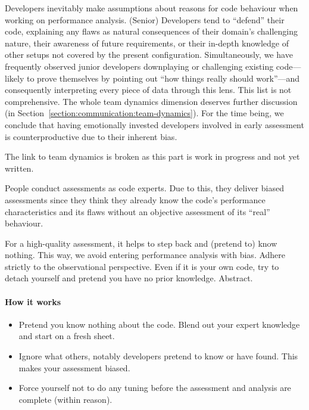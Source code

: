Developers inevitably make assumptions about reasons for code behaviour when working on performance analysis.
(Senior) Developers tend to ``defend'' their code, explaining any flaws as
natural consequences of their domain's challenging nature, their awareness of future requirements, or their in-depth knowledge of other setups not covered by the present configuration.
Simultaneously, we have frequently observed junior developers downplaying or
challenging existing code---likely to prove themselves by pointing out ``how
things really should work''---and consequently interpreting every piece of data
through this lens.
This list is not comprehensive.
The whole team dynamics dimension deserves further discussion (in
Section~\ref{section:communication:team-dynamics}).
For the time being, we conclude that having emotionally invested developers
involved in early assessment is counterproductive due to their inherent bias.


\begin{wip}
 The link to team dynamics is broken as this part is work in progress and not yet written.
\end{wip}

\begin{assessmentcrime}
\label{assessmentcrime:code-expert-bias}
People conduct assessments as code experts.
Due to this, they deliver biased assessments since they think they already know the code's performance characteristics and its flaws without an objective assessment of its ``real'' behaviour.
\end{assessmentcrime}


For a high-quality assessment, it helps to step back and (pretend to) know nothing.
This way, we avoid entering performance analysis with bias.
Adhere strictly to the observational perspective.
Even if it is your own code, try to detach yourself and pretend you have no prior knowledge.
Abstract.





\paragraph*{How it works}

\begin{itemize}[noitemsep]
  \item[$\boxplus$] Pretend you know nothing about the code. Blend out your
  expert knowledge and start on a fresh sheet.
  \item[$\boxplus$] Ignore what others, notably developers pretend to know or have found. This makes your assessment biased.
  \item[$\boxplus$] Force yourself not to do any tuning before the assessment and analysis are complete (within reason). 
\end{itemize}


